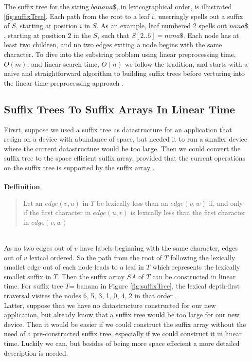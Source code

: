\documentclass[12pt]{article} %
\begin{document}
The suffix tree for the string $banana\$$, in lexicographical order, is illustrated \ref{fig:suffixTree}. Each path from the root to a leaf $i$, unerringly spells out a suffix of $S$, starting at position $i$ in $S$. As an example, leaf numbered $2$ spells out $nana\$$, starting at position $2$ in the $S$, such that $S[2..6] = nana\$$. Each node has at least two children, and no two edges exiting a node begins with the same character. 
\newline
To dive into the substring problem using linear preprocessing time, $O(m)$, and linear search time, $O(n)$ we follow the tradition, and starts with a naive and straightforward algorithm to building suffix trees before verturing into the linear time preprocessing approach \cite{gusfield}. 


\subsection{Suffix Trees To Suffix Arrays In Linear Time}

Firsrt, suppose we used a suffix tree as datastructure for an application that resign on a device with abundance of space, but needed it to run a smaller device where the current datastructure would be too large. Then we could convert the suffix tree to the space efficient suffix array, provided that the current operations on the suffix tree is supported by the suffix array \cite{gusfield}. 
\\ \\
\textbf{Deffinition}
\begin{quote}
 Let an $edge(v, u)$ in $T$ be lexically less than an $edge(v, w)$ if, and only if the first character in $edge(u, v)$ is lexically less than the first character in $edge(v, w)$ \cite{gusfield}
\end{quote}
\\
As no two edges out of $v$ have labels beginning with the same character, edges out of $v$ lexical ordered. So the path from the root of $T$ following the lexically smallet edge out of each node leads to a leaf in $T$ which represents the lexically smallet suffix in $T$. Then the suffix array $SA$ of $T$ can be constructed in linear time.
For suffix tree $T$= banana in Figure \ref{fig:suffixTree}, the lexical depth-first traversal visites the nodes 6, 5, 3, 1, 0, 4, 2 in that order \cite{gusfield}. 
\\
Latter, suppose that we have no datastructure constructed for our new application, but already know that a suffix tree would be too large for our new device. Then it would be easier if we could construct the suffix array without the need of a pre-constructed suffix tree, especially if we could construct it in linear time. Luckily we can, but besides of being more space effecient a more detailed description is needed.
\end{document}
